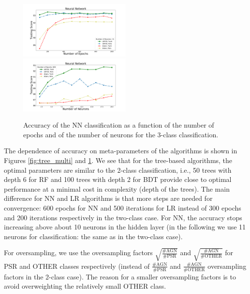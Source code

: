 \begin{figure}[h]
\center
\includegraphics[width=0.5\textwidth]{plots/nn_epoch_train_multi.pdf}\\
\includegraphics[width=0.5\textwidth]{plots/nn_neuron_train_multi.pdf}
\caption{Accuracy of the NN classification as a function of the number of epochs and of the number of neurons
 for the 3-class classification. 
 }
\label{fig:nets_multi}
\end{figure}


The dependence of accuracy on meta-parameters of the algorithms is shown in Figures \ref{fig:tree_multi} and \ref{fig:nets_multi}.
We see that for the tree-based algorithms, the optimal parameters are similar to the 2-class classification, i.e., 50 trees with depth 6 for RF and 100 trees with depth 2 for BDT 
provide close to optimal performance at a minimal cost in complexity (depth of the trees).
The main difference for NN and LR algorithms is that more steps are needed for convergence: 600 epochs for NN and 500 iterations for LR instead of 300 epochs and 200 iterations respectively in the two-class case. 
For NN, the accuracy stops increasing above about 10 neurons in the hidden layer (in the following we use 11 neurons for classification: the same as in the two-class case).

For oversampling, we use the oversampling factors $\sqrt{\frac{\text{\# AGN}}{\text{\# PSR}}}$ and $\sqrt{\frac{\text{\# AGN}}{\text{\# OTHER}}}$ for PSR and OTHER classes respectively (instead of $\frac{\text{\# AGN}}{\text{\# PSR}}$ and $\frac{\text{\# AGN}}{\text{\# OTHER}}$ oversampling factors in the 2-class case).
The reason for a smaller oversampling factors is to avoid overweighting the relatively small OTHER class.

